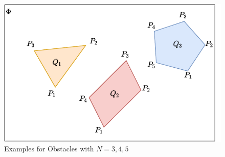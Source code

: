 \begin{figure}[H]
    \begin{center}
    \includegraphics[width=\textwidth]{figures/approach/figObstacles.pdf}
    \end{center}
    \caption[Examples for Obstacles with $N=3,4,5$]{Examples for Obstacles with $N=3,4,5$}
    \label{fig:figObstacles}
\end{figure}

